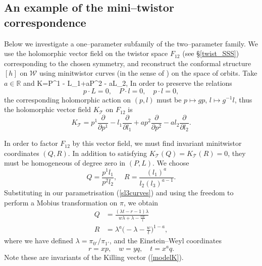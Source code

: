 \subsection{An example of the mini--twistor correspondence}
\label{mini_twistor}
Below we investigate a one--parameter subfamily of the two--parameter family. We use the holomorphic vector field on 
the twistor space
$F_{12}$  (see \S\ref{twist_SSS})
corresponding to the chosen symmetry, and reconstruct the conformal structure $[h]$ on $\mathcal{W}$ using minitwistor curves 
(in the sense of \cite{hitchin})
on the space of orbits. Take $a\in \mathbb{R}$ and
\be
\label{modelK}
K=P^1 - L_1+aP^2 - aL_2,
\ee
In order to preserve the relations
\[
p\cdot L=0,\quad P\cdot l=0,\quad p\cdot l=0, 
\]
the corresponding holomorphic action on $(p,l)$ must be $p\mapsto gp$, $l\mapsto g^{-1}l$, thus the holomorphic vector field $ K_\mathscr{T}$ on $F_{12}$ is
\[
 K_\mathscr{T}=p^1\frac{\partial}{\partial p^1} - l_1\frac{\partial}{\partial l_1}+ap^2\frac{\partial}{\partial p^2} - al_2\frac{\partial}{\partial l_2}.
\]

In order to factor $F_{12}$ by this vector field, we must find invariant minitwistor coordinates $(Q,R)$. In addition to satisfying $ K_\mathscr{T}(Q)= K_\mathscr{T}(R)=0$, they must be homogeneous of degree zero in $(P,L)$. We choose
\[
Q=\frac{p^1l_1}{p^2l_2},\quad R=\frac{(l_1)^a}{l_2(l_3)^{a-1}}.
\]
Substituting in our parametrisation (\ref{sl3curves}) and using the freedom to perform a Mobius transformation on $\pi$, we obtain
\begin{align}
\label{QR}
Q &= \frac{(\lambda t-r-1)\lambda}{w\lambda+\lambda-\frac{rw}{t}}\\
R &= \lambda^a\Big(-\lambda-\frac{w}{t}\Big)^{1-a},\nonumber
\end{align}
where we have defined $\lambda=\pi_{0'}/\pi_{1'}$, and the Einstein--Weyl coordinates
\[
r=xp,\quad w=yq, \quad t=x^aq.
\]
Note these are invariants of the Killing vector (\ref{modelK}).

